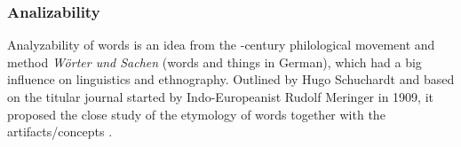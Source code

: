 \subsubsection{Analizability}

Analyzability of words is an idea from the -century philological movement and method \textit{Wörter und Sachen} (words and things in German), which had a big influence on linguistics and ethnography. Outlined by Hugo Schuchardt and based on the titular journal \textit{} started by Indo-Europeanist Rudolf Meringer in 1909, it proposed the close study of the etymology of words together with the artifacts/concepts \autocite{ortutay_magyar_1977}. 





